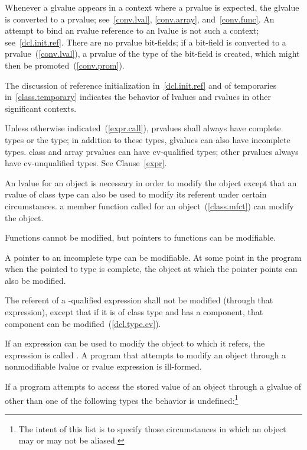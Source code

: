 \pnum
Whenever a glvalue appears in a context where a prvalue is expected, the glvalue is converted
to a prvalue; see~\ref{conv.lval}, \ref{conv.array},
and~\ref{conv.func}.
\enternote
An attempt to bind an rvalue reference to an lvalue is not such a context; see~\ref{dcl.init.ref}.
\exitnote
\enternote
There are no prvalue bit-fields; if a bit-field is converted to a
prvalue~(\ref{conv.lval}), a prvalue of the type of the bit-field is
created, which might then be promoted~(\ref{conv.prom}).
\exitnote

\pnum
The discussion of reference initialization in~\ref{dcl.init.ref} and of
temporaries in~\ref{class.temporary} indicates the behavior of lvalues
and rvalues in other significant contexts.

\pnum
Unless otherwise indicated~(\ref{expr.call}), prvalues
shall always have complete types or the
 type; in addition to these types, glvalues can also have
incomplete types.
\enternote
class and array prvalues can have cv-qualified types; other prvalues
always have cv-unqualified types. See Clause~\ref{expr}.
\exitnote

\pnum
An lvalue for an object is necessary in order to modify the object
except that an rvalue of class type can also be used to modify its
referent under certain circumstances. \enterexample a member function
called for an object~(\ref{class.mfct}) can modify the object.
\exitexample

\pnum
Functions cannot be modified, but pointers to functions can be
modifiable.

\pnum
A pointer to an incomplete type can be modifiable. At some point in the
program when the pointed to type is complete, the object at which the
pointer points can also be modified.

\pnum
The referent of a -qualified expression shall not be
modified (through that expression), except that if it is of class type
and has a  component, that component can be
modified~(\ref{dcl.type.cv}).

\pnum
If an expression can be used to modify the object to which it refers,
the expression is called . A program that attempts
to modify an object through a nonmodifiable lvalue or rvalue expression
is ill-formed.

\pnum
If a program attempts to access the stored value of an object through a glvalue
of other than one of the following types the behavior is
undefined:\footnote{The intent of this list is to specify those circumstances in which an
object may or may not be aliased.}

